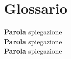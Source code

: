 
\backmatter
\twocolumn                          %
\chapter{Glossario}\label{glos}
\linespread{1.3} \small

\noindent \textbf{Parola} spiegazione\\
\noindent \textbf{Parola} spiegazione\\
\noindent \textbf{Parola} spiegazione\\
